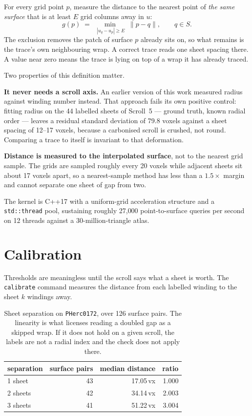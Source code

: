 \documentclass[11pt,a4paper]{article}
\begin{document}
For every grid point $p$, measure the distance to the nearest point of
\emph{the same surface} that is at least $E$ grid columns away in $u$:
\[
g(p) \;=\; \min_{\;|u_q - u_p| \ge E} \; \lVert p - q \rVert ,
\qquad q \in S .
\]
The exclusion removes the patch of surface $p$ already sits on, so what remains
is the trace's own neighbouring wrap. A correct trace reads one sheet spacing
there. A value near zero means the trace is lying on top of a wrap it has
already traced.

Two properties of this definition matter.

\textbf{It never needs a scroll axis.} An earlier version of this work measured
radius against winding number instead. That approach fails its own positive
control: fitting radius on the 44 labelled sheets of Scroll~5 --- ground truth,
known radial order --- leaves a residual standard deviation of 79.8 voxels
against a sheet spacing of 12--17 voxels, because a carbonised scroll is
crushed, not round. Comparing a trace to itself is invariant to that
deformation.

\textbf{Distance is measured to the interpolated surface}, not to the nearest
grid sample. The grids are sampled roughly every 20 voxels while adjacent sheets
sit about 17 voxels apart, so a nearest-sample method has less than a $1.5\times$
margin and cannot separate one sheet of gap from two.

The kernel is C++17 with a uniform-grid acceleration structure and a
\texttt{std::thread} pool, sustaining roughly 27{,}000 point-to-surface queries
per second on 12 threads against a 30-million-triangle atlas.

\section{Calibration}

Thresholds are meaningless until the scroll says what a sheet is worth. The
\texttt{calibrate} command measures the distance from each labelled winding to
the sheet $k$ windings away.

\begin{table}[h]
\centering
\small
\begin{tabular}{lrrr}
\toprule
separation & surface pairs & median distance & ratio \\
\midrule
1 sheet  & 43 & 17.05\,vx & 1.000 \\
2 sheets & 42 & 34.14\,vx & 2.003 \\
3 sheets & 41 & 51.22\,vx & 3.004 \\
\bottomrule
\end{tabular}
\caption{Sheet separation on \texttt{PHerc0172}, over 126 surface pairs. The
linearity is what licenses reading a doubled gap as a skipped wrap. If it does
not hold on a given scroll, the labels are not a radial index and the check does
not apply there.}
\end{table}
\end{document}
